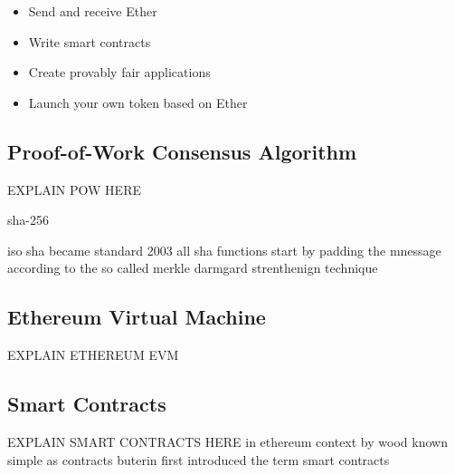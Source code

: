 \begin{itemize}
	\item Send and receive Ether
	\item Write smart contracts
	\item Create provably fair applications
	\item Launch your own token based on Ether
\end{itemize}


\clearpage

\subsection{Proof-of-Work Consensus Algorithm}
\label{subsec:background:first_section:second_subsection}
EXPLAIN POW HERE


\cite{van2014encyclopedia} sha-256

\cite{isoSHA-256} iso sha became standard 2003 %
\cite{coron2005merkle} all sha functions start by padding the mnessage according to the so called merkle darmgard strenthenign technique
\cite{nakamoto2008peer}
\cite{back2002hashcash}

\subsection{Ethereum Virtual Machine}
\label{subsec:background:first_section:ethereum}
EXPLAIN ETHEREUM \ac{EVM}

\cite{dannen2017introducing}
\cite{wood2014ethereum}

\subsection{Smart Contracts}
\label{subsec:background:first_section:first_subsection}
EXPLAIN SMART CONTRACTS HERE 
in ethereum context by wood known simple as contracts
buterin first introduced the term smart contracts
\cite{buterin2013ethereum}
\cite{wood2014ethereum}
\cite{dannen2017introducing}



